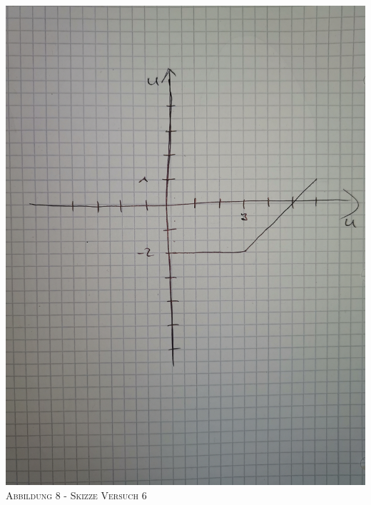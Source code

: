 \documentclass[11pt]{article}
\begin{document}
\begin{center}
\includegraphics[scale=0.1]{6.jpg}\\
\small \textsc{Abbildung 8 - Skizze Versuch 6}\\
\end{center}

\newpage
\end{document}
